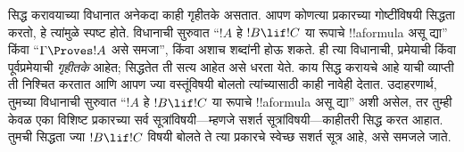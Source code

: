 \documentclass[../../../include/open-logic-section]{subfiles}
\begin{document}
सिद्ध करावयाच्या विधानात अनेकदा काही गृहीतके असतात. आपण कोणत्या प्रकारच्या गोष्टींविषयी सिद्धता करतो, हे त्यांमुळे स्पष्ट होते. विधानाची सुरुवात “$!A$ हे $!B \lif !C$ या रूपाचे !!a{formula} असू द्या” किंवा “$\Gamma \Proves !A$ असे समजा”, किंवा अशाच शब्दांनी होऊ शकते. ही त्या विधानाची, प्रमेयाची किंवा पूर्वप्रमेयाची \emph{गृहीतके} आहेत; सिद्धतेत ती सत्य आहेत असे धरता येते. काय सिद्ध करायचे आहे याची व्याप्ती ती निश्चित करतात आणि आपण ज्या वस्तूंविषयी बोलतो त्यांच्यासाठी काही नावेही देतात. उदाहरणार्थ, तुमच्या विधानाची सुरुवात “$!A$ हे $!B \lif !C$ या रूपाचे !!a{formula} असू द्या” अशी असेल, तर तुम्ही केवळ एका विशिष्ट प्रकारच्या सर्व सूत्रांविषयी---म्हणजे सशर्त सूत्रांविषयी---काहीतरी सिद्ध करत आहात. तुमची सिद्धता ज्या $!B \lif !C$ विषयी बोलते ते त्या प्रकारचे स्वेच्छ सशर्त सूत्र आहे, असे समजले जाते.
\end{document}
